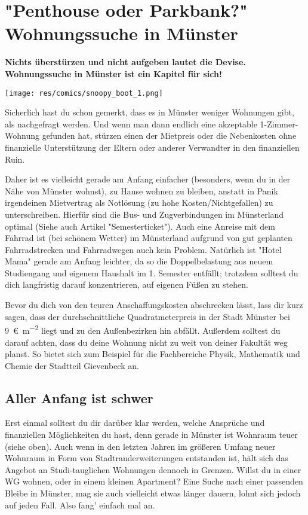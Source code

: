 \section[\texorpdfstring{"Penthouse oder Parkbank?"}{„Penthouse oder Parkbank?“} Wohnungssuche in Münster]{"Penthouse oder Parkbank?"\\Wohnungssuche in Münster}
\begin{multicols*}{2}
\textbf{Nichts überstürzen und nicht aufgeben lautet die Devise. Wohnungssuche in Münster ist ein Kapitel für sich!}

\begin{center}
\texttt{[image: res/comics/snoopy\_boot\_1.png]}
\end{center}

Sicherlich hast du schon gemerkt, dass es in Münster weniger Wohnungen gibt, als nachgefragt werden. Und wenn man dann endlich eine akzeptable 1-Zimmer-Wohnung gefunden hat, stürzen einen der Mietpreis oder die Nebenkosten ohne finanzielle Unterstützung der Eltern oder anderer Verwandter in den finanziellen Ruin.

Daher ist es vielleicht gerade am Anfang einfacher (besonders, wenn du in der Nähe von Münster wohnst), zu Hause wohnen zu bleiben, anstatt in Panik irgendeinen Mietvertrag als Notlösung (zu hohe Kosten/Nichtgefallen) zu unterschreiben. Hierfür sind die Bus- und Zugverbindungen im Münsterland optimal (Siehe auch Artikel "Semesterticket"). Auch eine Anreise mit dem Fahrrad ist (bei schönem Wetter) im Münsterland aufgrund von gut geplanten Fahrradstrecken und Fahrradwegen auch kein Problem. Natürlich ist "Hotel Mama" gerade am Anfang leichter, da so die Doppelbelastung aus neuem Studiengang und eigenem Haushalt im 1. Semester entfällt; trotzdem solltest du dich langfristig darauf konzentrieren, auf eigenen Füßen zu stehen.

Bevor du dich von den teuren Anschaffungskosten abschrecken lässt, lass dir kurz sagen, dass der durchschnittliche Quadratmeterpreis in der Stadt Münster bei \SI{9}{\euro\per\m\squared} liegt und zu den Außenbezirken hin abfällt. Außerdem solltest du darauf achten, dass du deine Wohnung nicht zu weit von deiner Fakultät weg planst. So bietet sich zum Beispiel für die Fachbereiche Physik, Mathematik und Chemie der Stadtteil Gievenbeck an.

\subsection*{Aller Anfang ist schwer}
Erst einmal solltest du dir darüber klar werden, welche Ansprüche und finanziellen Möglichkeiten du hast, denn gerade in Münster ist Wohnraum teuer (siehe oben). Auch wenn in den letzten Jahren im größeren Umfang neuer Wohnraum in Form von Stadtranderweiterungen entstanden ist, hält sich das Angebot an Studi-tauglichen Wohnungen dennoch in Grenzen. Willst du in einer WG wohnen, oder in einem kleinen Apartment? Eine Suche nach einer passenden Bleibe in Münster, mag sie auch vielleicht etwas länger dauern, lohnt sich jedoch auf jeden Fall. Also fang' einfach mal an.


\end{multicols*}

